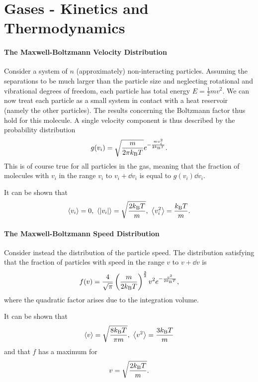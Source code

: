 \section{Gases - Kinetics and Thermodynamics}

\paragraph{The Maxwell-Boltzmann Velocity Distribution}
Consider a system of $n$ (approximately) non-interacting particles. Assuming the separations to be much larger than the particle size and neglecting rotational and vibrational degrees of freedom, each particle has total energy $E = \frac{1}{2}mv^{2}$. We can now treat each particle as a small system in contact with a heat reservoir (namely the other particles). The results concerning the Boltzmann factor thus hold for this molecule. A single velocity component is thus described by the probability distribution
\begin{align*}
	g(v_{i}) = \sqrt{\frac{m}{2\pi k_{\text{B}} T}}e^{-\frac{mv_{i}^{2}}{2k_{\text{B}} T}}.
\end{align*}
This is of course true for all particles in the gas, meaning that the fraction of molecules with $v_{i}$ in the range $v_{i}$ to $v_{i} + \dd{v_{i}}$ is equal to $g(v_{i})\dd{v_{i}}$.

It can be shown that
\begin{align*}
	\expval{v_{i}} = 0,\ \expval{\abs{v_{i}}} = \sqrt{\frac{2k_{\text{B}} T}{m}},\ \expval{v_{i}^{2}} = \frac{k_{\text{B}} T}{m}.
\end{align*}

\paragraph{The Maxwell-Boltzmann Speed Distribution}
Consider instead the distribution of the particle speed. The distribution satisfying that the fraction of particles with speed in the range $v$ to $v + \dd{v}$ is
\begin{align*}
	f(v) = \frac{4}{\sqrt{\pi}}\left(\frac{m}{2k_{\text{B}} T}\right)^{\frac{3}{2}}v^{2}e^{-\frac{v^{2}}{2k_{\text{B}} T}},
\end{align*}
where the quadratic factor arises due to the integration volume.

It can be shown that
\begin{align*}
	\expval{v} = \sqrt{\frac{8k_{\text{B}} T}{\pi m}},\ \expval{v^{2}} = \frac{3k_{\text{B}} T}{m}
\end{align*}
and that $f$ has a maximum for
\begin{align*}
	v = \sqrt{\frac{2k_{\text{B}} T}{m}}.
\end{align*}

